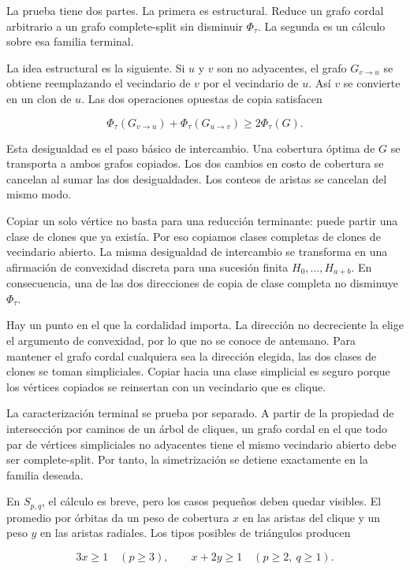 \documentclass[
  11pt,
]{article}
\begin{document}
La prueba tiene dos partes. La primera es estructural. Reduce un grafo
cordal arbitrario a un grafo complete-split sin disminuir \(\Phi_\tau\).
La segunda es un cálculo sobre esa familia terminal.

La idea estructural es la siguiente. Si \(u\) y \(v\) son no adyacentes,
el grafo \(G_{v\to u}\) se obtiene reemplazando el vecindario de \(v\)
por el vecindario de \(u\). Así \(v\) se convierte en un clon de \(u\).
Las dos operaciones opuestas de copia satisfacen

\[
\Phi_\tau(G_{v\to u})
+
\Phi_\tau(G_{u\to v})
\ge
2\Phi_\tau(G).
\]

Esta desigualdad es el paso básico de intercambio. Una cobertura óptima
de \(G\) se transporta a ambos grafos copiados. Los dos cambios en costo
de cobertura se cancelan al sumar las dos desigualdades. Los conteos de
aristas se cancelan del mismo modo.

Copiar un solo vértice no basta para una reducción terminante: puede
partir una clase de clones que ya existía. Por eso copiamos clases
completas de clones de vecindario abierto. La misma desigualdad de
intercambio se transforma en una afirmación de convexidad discreta para
una sucesión finita \(H_0,\ldots,H_{a+b}\). En consecuencia, una de las
dos direcciones de copia de clase completa no disminuye \(\Phi_\tau\).

Hay un punto en el que la cordalidad importa. La dirección no
decreciente la elige el argumento de convexidad, por lo que no se conoce
de antemano. Para mantener el grafo cordal cualquiera sea la dirección
elegida, las dos clases de clones se toman simpliciales. Copiar hacia
una clase simplicial es seguro porque los vértices copiados se
reinsertan con un vecindario que es clique.

La caracterización terminal se prueba por separado. A partir de la
propiedad de intersección por caminos de un árbol de cliques, un grafo
cordal en el que todo par de vértices simpliciales no adyacentes tiene
el mismo vecindario abierto debe ser complete-split. Por tanto, la
simetrización se detiene exactamente en la familia deseada.

En \(S_{p,q}\), el cálculo es breve, pero los casos pequeños deben
quedar visibles. El promedio por órbitas da un peso de cobertura \(x\)
en las aristas del clique y un peso \(y\) en las aristas radiales. Los
tipos posibles de triángulos producen

\[
3x\ge1
\quad(p\ge3),
\qquad
x+2y\ge1
\quad(p\ge2,\ q\ge1).
\]
\end{document}
